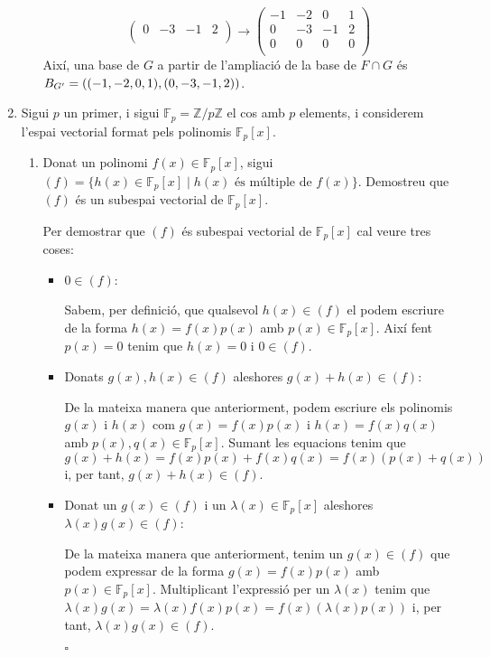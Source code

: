 \documentclass[11pt,a4paper]{article}
\newcommand*{\QED}{\hfill\ensuremath{\square}}
\begin{document}
\begin{enumerate}
\begin{enumerate}
\begin{equation*}
\begin{pmatrix}
            0 & -3 & -1 & 2 \\
            \end{pmatrix} \rightarrow
            \begin{pmatrix}
            -1 & -2 & 0 & 1 \\
            0 & -3 & -1 & 2 \\
            0 & 0 & 0 & 0 \\
            \end{pmatrix}
        \end{equation*}
        Així, una base de $G$ a partir de l'ampliació de la base de $F\cap G$ és $B_{G'}=((-1,-2,0,1),\\(0,-3,-1,2))$.
    \end{enumerate}
    \item Sigui $p$ un primer, i sigui $\mathbb{F}_p=\mathbb{Z}/p\mathbb{Z}$ el cos amb $p$ elements, i considerem l’espai vectorial format pels polinomis $\mathbb{F}_p[x]$.
    \begin{enumerate}
        \item  Donat un polinomi $f(x)\in\mathbb{F}_p[x]$, sigui $(f)=\{h(x)\in \mathbb{F}_p[x]\mid h(x) \text{ és múltiple de } f(x)\}$. Demostreu que $(f)$ és un subespai vectorial de $\mathbb{F}_p[x]$.\par Per demostrar que $(f)$ és subespai vectorial de $\mathbb{F}_p[x]$ cal veure tres coses:
        \begin{itemize}
            \item $0\in (f)$:\par
            Sabem, per definició, que qualsevol $h(x)\in (f)$ el podem escriure de la forma $h(x)=f(x)p(x)$ amb $p(x)\in\mathbb{F}_p[x]$. Així fent $p(x)=0$ tenim que $h(x)=0$ i $0\in (f)$.
            \item Donats $g(x),h(x)\in (f)$ aleshores $g(x)+h(x)\in (f)$:\par
            De la mateixa manera que anteriorment, podem escriure els polinomis $g(x)$ i $h(x)$ com $g(x)=f(x)p(x)$ i $h(x)=f(x)q(x)$ amb $p(x),q(x)\in\mathbb{F}_p[x]$. Sumant les equacions tenim que $g(x)+h(x)=f(x)p(x)+f(x)q(x)=f(x)(p(x)+q(x))$ i, per tant, $g(x)+h(x)\in (f)$.
            \item Donat un $g(x)\in (f)$ i un $\lambda(x)\in\mathbb{F}_p[x]$ aleshores $\lambda(x) g(x)\in (f)$:\par
            De la mateixa manera que anteriorment, tenim un $g(x)\in (f)$ que podem expressar de la forma $g(x)=f(x)p(x)$ amb $p(x)\in\mathbb{F}_p[x]$. Multiplicant l'expressió per un $\lambda(x)$ tenim que $\lambda(x)g(x)=\lambda(x)f(x)p(x)=f(x)(\lambda(x)p(x))$ i, per tant, $\lambda(x) g(x)\in (f)$.\par \QED

\end{itemize}
\end{enumerate}
\end{enumerate}
\end{document}

